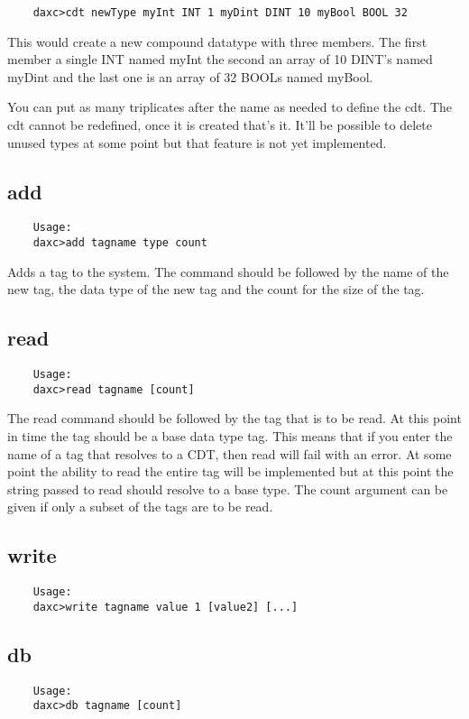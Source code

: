 	\begin{verbatim}
	daxc>cdt newType myInt INT 1 myDint DINT 10 myBool BOOL 32
	\end{verbatim}

	This would create a new compound datatype with three members.  The first member
	a single INT named myInt the second an array of 10 DINT's named myDint and the
	last one is an array of 32 BOOLs named myBool.

	You can put as many triplicates after the name as needed to define the cdt.  The
	cdt cannot be redefined, once it is created that's it.  It'll be possible to
	delete unused types at some point but that feature is not yet implemented.

	\subsection{add}
	\begin{verbatim}
	Usage:
	daxc>add tagname type count
	\end{verbatim}

	Adds a tag to the system.  The command should be followed by the name of the new
	tag, the data type of the new tag and the count for the size of the tag.

	\subsection{read}
	\begin{verbatim}
	Usage:
	daxc>read tagname [count]
	\end{verbatim}

	The read command should be followed by the tag that is to be read.  At this
	point in time the tag should be a base data type tag.  This means that if you
	enter the name of a tag that resolves to a CDT, then read will fail with an
	error.  At some point the ability to read the entire tag will be implemented but
	at this point the string passed to read should resolve to a base type.  The
	count argument can be given if only a subset of the tags are to be read.

	\subsection{write}
	\begin{verbatim}
	Usage:
	daxc>write tagname value 1 [value2] [...]
	\end{verbatim}

	\subsection{db}
	\begin{verbatim}
	Usage:
	daxc>db tagname [count]
	\end{verbatim}

